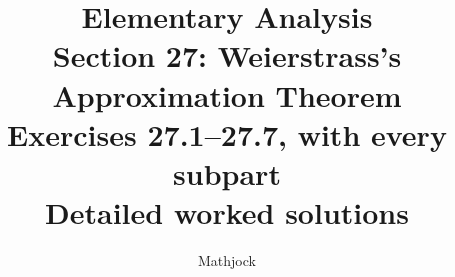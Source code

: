 
\title{\textbf{Elementary Analysis}\\[0.3em]
Section 27: Weierstrass's Approximation Theorem\\[0.4em]
\large Exercises 27.1--27.7, with every subpart\\
Detailed worked solutions}
\author{Mathjock}
\date{}

\maketitle
\bookinfo
\tableofcontents
\clearpage
\setcounter{section}{26}


